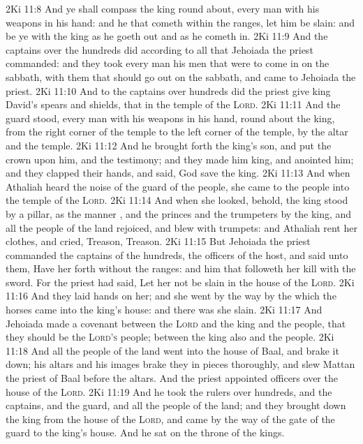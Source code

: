 \vs 2Ki 11:8 And ye shall compass the king round about, every man with his weapons in his hand: and he that cometh within the ranges, let him be slain: and be ye with the king as he goeth out and as he cometh in.
\vs 2Ki 11:9 And the captains over the hundreds did according to all  that Jehoiada the priest commanded: and they took every man his men that were to come in on the sabbath, with them that should go out on the sabbath, and came to Jehoiada the priest.
\vs 2Ki 11:10 And to the captains over hundreds did the priest give king David's spears and shields, that  in the temple of the \textsc{Lord}.
\vs 2Ki 11:11 And the guard stood, every man with his weapons in his hand, round about the king, from the right corner of the temple to the left corner of the temple,  by the altar and the temple.
\vs 2Ki 11:12 And he brought forth the king's son, and put the crown upon him, and  the testimony; and they made him king, and anointed him; and they clapped their hands, and said, God save the king.
\vs 2Ki 11:13 And when Athaliah heard the noise of the guard  of the people, she came to the people into the temple of the \textsc{Lord}.
\vs 2Ki 11:14 And when she looked, behold, the king stood by a pillar, as the manner , and the princes and the trumpeters by the king, and all the people of the land rejoiced, and blew with trumpets: and Athaliah rent her clothes, and cried, Treason, Treason.
\vs 2Ki 11:15 But Jehoiada the priest commanded the captains of the hundreds, the officers of the host, and said unto them, Have her forth without the ranges: and him that followeth her kill with the sword. For the priest had said, Let her not be slain in the house of the \textsc{Lord}.
\vs 2Ki 11:16 And they laid hands on her; and she went by the way by the which the horses came into the king's house: and there was she slain.
\vs 2Ki 11:17 And Jehoiada made a covenant between the \textsc{Lord} and the king and the people, that they should be the \textsc{Lord's} people; between the king also and the people.
\vs 2Ki 11:18 And all the people of the land went into the house of Baal, and brake it down; his altars and his images brake they in pieces thoroughly, and slew Mattan the priest of Baal before the altars. And the priest appointed officers over the house of the \textsc{Lord}.
\vs 2Ki 11:19 And he took the rulers over hundreds, and the captains, and the guard, and all the people of the land; and they brought down the king from the house of the \textsc{Lord}, and came by the way of the gate of the guard to the king's house. And he sat on the throne of the kings.
